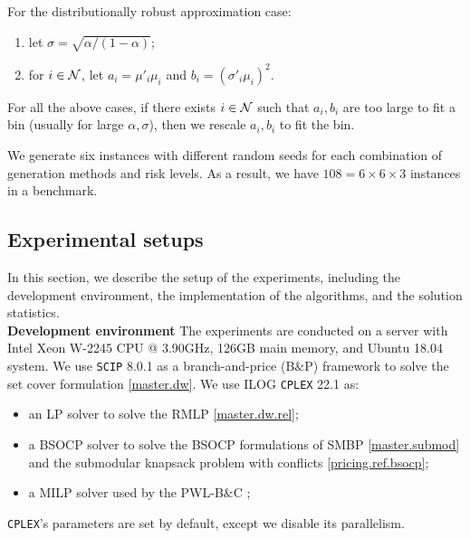 For the distributionally robust approximation case:
\begin{enumerate}
    \item let $\sigma = \sqrt{\alpha/(1-\alpha)}$;
    \item for $i \in \mathcal N$, let $a_i = \mu'_i \mu_i$ and $b_i = {(\sigma'_i \mu_i)}^2$.
\end{enumerate}


For all the above cases, if there exists $i \in \mathcal N$ such that $a_i, b_i$ are too large to fit a bin (usually for large $\alpha, \sigma$), then we rescale $a_i, b_i$ to fit the bin.

 
 We generate six instances with different random seeds for each combination of generation methods and risk levels. As a result, we have $108 = 6 \times 6 \times 3$ instances in a benchmark.


\subsection{Experimental setups}
In this section, we describe the setup of the experiments, including the development environment, the implementation of the algorithms, and the solution statistics.\\

\textbf{Development environment} The experiments are conducted on a server with  Intel Xeon W-2245 CPU @ 3.90GHz, 126GB main memory, and Ubuntu 18.04 system. We use \texttt{SCIP} 8.0.1 \citep{gleixneretal2018oo} as a branch-and-price (B$\&$P) framework to solve the set cover formulation \eqref{master.dw}. We use ILOG \texttt{CPLEX} 22.1 as:
\begin{itemize}
    \item an LP solver to solve the RMLP \eqref{master.dw.rel};
    \item a BSOCP solver to solve the BSOCP formulations of SMBP  \eqref{master.submod} and the submodular knapsack problem with conflicts \eqref{pricing.ref.bsocp};
    \item a MILP solver used by the PWL-B$\&$C ;
\end{itemize}
\texttt{CPLEX}'s parameters are set by default, except we disable its parallelism. \\

\begin{comment}
The experiments are divided into jobs. Each job invokes a solver to solve an instance, which is handled by a process of the multicore system CPU. To prevent possible mutual slowdown of the parallel processes, we run only one job per core at a time, so we use a maximum of three processes in parallel.
\end{comment}


